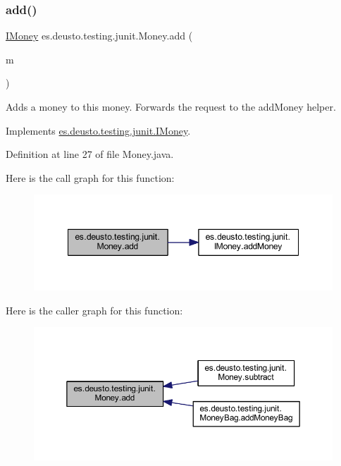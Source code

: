 \subsubsection{\texorpdfstring{add()}{add()}}
{\footnotesize\ttfamily \hyperlink{interfacees_1_1deusto_1_1testing_1_1junit_1_1_i_money}{I\+Money} es.\+deusto.\+testing.\+junit.\+Money.\+add (\begin{DoxyParamCaption}\item[{\hyperlink{interfacees_1_1deusto_1_1testing_1_1junit_1_1_i_money}{I\+Money}}]{m }\end{DoxyParamCaption})}

Adds a money to this money. Forwards the request to the add\+Money helper. 

Implements \hyperlink{interfacees_1_1deusto_1_1testing_1_1junit_1_1_i_money_a7f3ac1ced239e64294706155c569b8de}{es.\+deusto.\+testing.\+junit.\+I\+Money}.



Definition at line 27 of file Money.\+java.

Here is the call graph for this function\+:
\nopagebreak
\begin{figure}[H]
\begin{center}
\leavevmode
\includegraphics[width=348pt]{classes_1_1deusto_1_1testing_1_1junit_1_1_money_a6a3d64861c49dee89ffd0ed0c576045d_cgraph}
\end{center}
\end{figure}
Here is the caller graph for this function\+:
\nopagebreak
\begin{figure}[H]
\begin{center}
\leavevmode
\includegraphics[width=350pt]{classes_1_1deusto_1_1testing_1_1junit_1_1_money_a6a3d64861c49dee89ffd0ed0c576045d_icgraph}
\end{center}
\end{figure}
\mbox{\label{classes_1_1deusto_1_1testing_1_1junit_1_1_money_a223a447d5daf23b5e9cc0f551b72e328}} 
